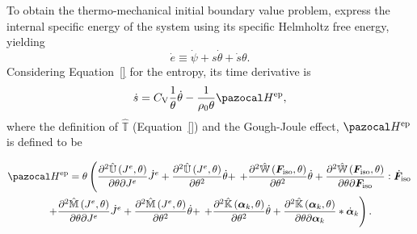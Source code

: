 To obtain the thermo-mechanical initial boundary value problem, express the internal specific energy of the system using its specific Helmholtz free energy, yielding
\begin{equation} \label{eq:derivative_specific_energy_form_helmholtz}
  \dot e \equiv \dot \psi + s\dot \theta + \dot s\theta.
\end{equation}
Considering Equation~\eqref{} for the entropy, its time derivative is
\begin{equation} \label{eq:derivative_entropy_thermo_mechanical}
\dot{s}= C_{\mathrm{V}} \frac{1}{\theta} \dot{\theta}- \frac{1}{\rho_0\theta}\pazocal H^\text{ep},
\end{equation}
where the definition of \(\hat{\mathbb T}\) (Equation~\eqref{}) and the Gough-Joule effect, \(\pazocal H^\text{ep}\) is defined to be
\begin{highlight}
\begin{multline}
\pazocal H^\text{ep} = \theta\left(
\frac{\partial^{2} \hat{\mathbb{U}}\left(J^{e}, \theta\right)}{\partial \theta \partial J^{e}} \dot J^{e}+\frac{\partial^{2} \hat{\mathbb{U}}\left(J^{e}, \theta\right)}{\partial \theta^{2}} \dot{\theta}+\right.
\left.+\frac{\partial^{2} \hat{\mathbb{W}}\left(\bm F_\text{iso}, \theta\right)}{\partial \theta^{2}} \dot{\theta}+\frac{\partial^{2} \hat{\mathbb{W}}\left(\bm F_\text{iso}, \theta\right)}{\partial \theta \partial \bm F_\text{iso}} : \dot{\bm F}_\text{iso}\right.\\
\left.+\frac{\partial^{2} \hat{\mathbb{M}}\left(J^{e}, \theta\right)}{\partial \theta \partial J^{e}} \dot J^{e}+\frac{\partial^{2} \hat{\mathbb{M}}\left(J^{e}, \theta\right)}{\partial \theta^{2}} \dot{\theta}+\right.
\left.+\frac{\partial^{2} \hat{\mathbb{K}}\left(\boldsymbol{\alpha}_{k}, \theta\right)}{\partial \theta^{2}} \dot{\theta}+\frac{\partial^{2} \hat{\mathbb{K}}\left(\boldsymbol{\alpha}_{k}, \theta\right)}{\partial \theta \partial \boldsymbol{\alpha}_{k}} * \dot{\bm\alpha}_{k}\right).
\end{multline}
\end{highlight}

